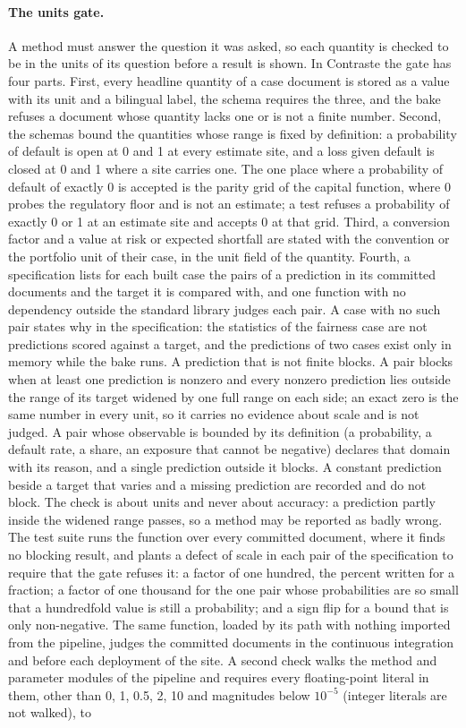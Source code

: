 \paragraph{The units gate.} A method must answer the question it was asked, so each quantity is checked to be in the units of its question before a result is shown. In Contraste the gate has four parts. First, every headline quantity of a case document is stored as a value with its unit and a bilingual label, the schema requires the three, and the bake refuses a document whose quantity lacks one or is not a finite number. Second, the schemas bound the quantities whose range is fixed by definition: a probability of default is open at 0 and 1 at every estimate site, and a loss given default is closed at 0 and 1 where a site carries one. The one place where a probability of default of exactly 0 is accepted is the parity grid of the capital function, where 0 probes the regulatory floor and is not an estimate; a test refuses a probability of exactly 0 or 1 at an estimate site and accepts 0 at that grid. Third, a conversion factor and a value at risk or expected shortfall are stated with the convention or the portfolio unit of their case, in the unit field of the quantity. Fourth, a specification lists for each built case the pairs of a prediction in its committed documents and the target it is compared with, and one function with no dependency outside the standard library judges each pair. A case with no such pair states why in the specification: the statistics of the fairness case are not predictions scored against a target, and the predictions of two cases exist only in memory while the bake runs. A prediction that is not finite blocks. A pair blocks when at least one prediction is nonzero and every nonzero prediction lies outside the range of its target widened by one full range on each side; an exact zero is the same number in every unit, so it carries no evidence about scale and is not judged. A pair whose observable is bounded by its definition (a probability, a default rate, a share, an exposure that cannot be negative) declares that domain with its reason, and a single prediction outside it blocks. A constant prediction beside a target that varies and a missing prediction are recorded and do not block. The check is about units and never about accuracy: a prediction partly inside the widened range passes, so a method may be reported as badly wrong. The test suite runs the function over every committed document, where it finds no blocking result, and plants a defect of scale in each pair of the specification to require that the gate refuses it: a factor of one hundred, the percent written for a fraction; a factor of one thousand for the one pair whose probabilities are so small that a hundredfold value is still a probability; and a sign flip for a bound that is only non-negative. The same function, loaded by its path with nothing imported from the pipeline, judges the committed documents in the continuous integration and before each deployment of the site. A second check walks the method and parameter modules of the pipeline and requires every floating-point literal in them, other than 0, 1, 0.5, 2, 10 and magnitudes below $10^{-5}$ (integer literals are not walked), to 